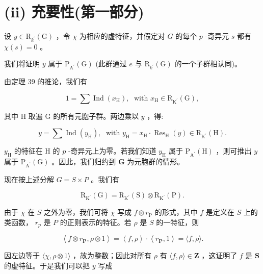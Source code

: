 \documentclass[10pt]{article}
\begin{document}
\section*{(ii) 充要性(第一部分)}

设 \(y \in  {\mathrm{R}}_{{k}^{\prime }}\left( \mathrm{G}\right)\) ，令 \(\chi\) 为相应的虚特征，并假定对 \(G\) 的每个 \(p\) -奇异元 \(s\) 都有 \(\chi \left( s\right)  = 0\) 。

我们将证明 \(y\) 属于 \({\mathrm{P}}_{{\mathrm{A}}^{\prime }}\left( \mathrm{G}\right)\) (此群通过 \(e\) 与 \({\mathrm{R}}_{{k}^{\prime }}\left( \mathrm{G}\right)\) 的一个子群相认同)。

由定理 39 的推论，我们有

\[
1 = \sum \operatorname{Ind}\left( {x}_{\mathrm{H}}\right) ,\;\text{ with }{x}_{\mathrm{H}} \in  {\mathrm{R}}_{{\mathrm{K}}^{\prime }}\left( \mathrm{G}\right) ,
\]

其中 \(\mathrm{H}\) 取遍 G 的所有元胞子群。两边乘以 \(y\) ，得:

\[
y = \sum \operatorname{Ind}\left( {y}_{\mathrm{H}}\right) ,\;\text{ with }{y}_{\mathrm{H}} = {x}_{\mathrm{H}} \cdot  {\operatorname{Res}}_{\mathrm{H}}\left( y\right)  \in  {\mathrm{R}}_{{\mathrm{K}}^{\prime }}\left( \mathrm{H}\right) .
\]

\({y}_{\mathrm{H}}\) 的特征在 \(\mathrm{H}\) 的 \(p\) -奇异元上为零。若我们知道 \({y}_{\mathrm{H}}\) 属于 \({\mathrm{P}}_{{\mathrm{A}}^{\prime }}\left( \mathrm{H}\right)\) ，则可推出 \(y\) 属于 \({\mathrm{P}}_{{\mathrm{A}}^{\prime }}\left( \mathrm{G}\right)\) 。因此，我们归约到 \(\mathbf{G}\) 为元胞群的情形。

现在按上述分解 \(G = S \times  P\) 。我们有

\[
{\mathrm{R}}_{{\mathrm{K}}^{\prime }}\left( \mathrm{G}\right)  = {\mathrm{R}}_{{\mathrm{K}}^{\prime }}\left( \mathrm{S}\right)  \otimes  {\mathrm{R}}_{{\mathrm{K}}^{\prime }}\left( \mathrm{P}\right) .
\]

由于 \(\chi\) 在 \(S\) 之外为零，我们可将 \(\chi\) 写成 \(f \otimes  {r}_{\mathrm{P}}\) 的形式，其中 \(f\) 是定义在 \(S\) 上的类函数， \({r}_{p}\) 是 \(P\) 的正则表示的特征。若 \(\rho\) 是 \(S\) 的一特征，则

\[
\left\langle  {f \otimes  {r}_{\mathbf{P}},\rho  \otimes  1}\right\rangle   = \left\langle  {f,\rho }\right\rangle   \cdot  \left\langle  {{r}_{\mathbf{P}},1}\right\rangle   = \langle f,\rho \rangle .
\]

因左边等于 \(\langle \chi ,\rho  \otimes  1\rangle\) ，故为整数；因此对所有 \(\rho\) 有 \(\langle f,\rho \rangle  \in  \mathbf{Z}\) ，这证明了 \(f\) 是 \(\mathbf{S}\) 的虚特征。于是我们可以把 \(y\) 写成
\end{document}
